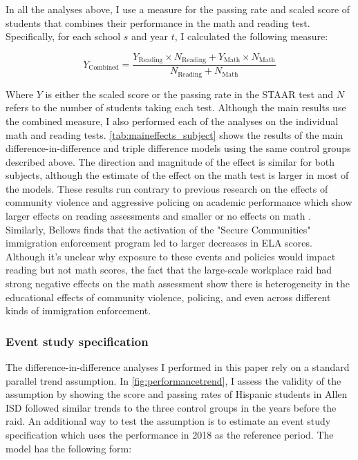 \documentclass[hidelinks,twoside]{article}
\begin{document}
In all the analyses above, I use a measure for the passing rate and scaled score of students that combines their performance in the math and reading test. Specifically, for each school $s$ and year $t$, I calculated the following measure:

\begin{equation*}
    Y_{\text{Combined}} = \frac{Y_{\text{Reading}} \times N_{\text{Reading}} + Y_{\text{Math}} \times N_{\text{Math}}}{N_{\text{Reading}} + N_{\text{Math}}}
\end{equation*}

\noindent Where $Y$ is either the scaled score or the passing rate in the STAAR test and $N$ refers to the number of students taking each test. Although the main results use the combined measure, I also performed each of the analyses on the individual math and reading tests. \autoref{tab:maineffects_subject} shows the results of the main difference-in-difference and triple difference models using the same control groups described above. The direction and magnitude of the effect is similar for both subjects, although the estimate of the effect on the math test is larger in most of the models. These results run contrary to previous research on the effects of community violence and aggressive policing on academic performance which show larger effects on reading assessments and smaller or no effects on math \citep{sharkey_2014_high,schwartz_2021_the,laurito_2019_school,legewie_2019_aggressive}. Similarly, Bellows \citeyearpar{bellows_2021_the} finds that the activation of the "Secure Communities" immigration enforcement program led to larger decreases in ELA scores. Although it's unclear why exposure to these events and policies would impact reading but not math scores, the fact that the large-scale workplace raid had strong negative effects on the math assessment show there is heterogeneity in the educational effects of community violence, policing, and even across different kinds of immigration enforcement. 

\subsubsection*{Event study specification}

The difference-in-difference analyses I performed in this paper rely on a standard parallel trend assumption. In \autoref{fig:performancetrend}, I assess the validity of the assumption by showing the score and passing rates of Hispanic students in Allen ISD followed similar trends to the three control groups in the years before the raid. An additional way to test the assumption is to estimate an event study specification which uses the performance in 2018 as the reference period. The model has the following form:
\end{document}
